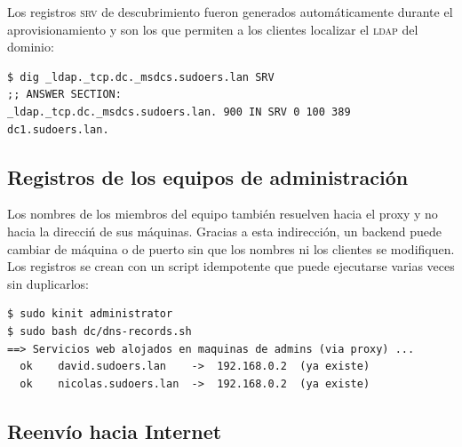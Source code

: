 
Los registros \textsc{srv} de descubrimiento fueron generados
autom\'aticamente durante el aprovisionamiento y son los que permiten a los
clientes localizar el \textsc{ldap} del dominio:

\begin{lstlisting}[style=terminal]
$ dig _ldap._tcp.dc._msdcs.sudoers.lan SRV
;; ANSWER SECTION:
_ldap._tcp.dc._msdcs.sudoers.lan. 900 IN SRV 0 100 389 dc1.sudoers.lan.
\end{lstlisting}


\subsection{Registros de los equipos de administraci\'on}

Los nombres de los miembros del equipo tambi\'en resuelven hacia el proxy y
no hacia la direcci\'n de sus m\'aquinas. Gracias a esta indirecci\'on, un
backend puede cambiar de m\'aquina o de puerto sin que los nombres ni los
clientes se modifiquen. Los registros se crean con un script idempotente
que puede ejecutarse varias veces sin duplicarlos:

\begin{lstlisting}[style=terminal]
$ sudo kinit administrator
$ sudo bash dc/dns-records.sh
==> Servicios web alojados en maquinas de admins (via proxy) ...
  ok    david.sudoers.lan    ->  192.168.0.2  (ya existe)
  ok    nicolas.sudoers.lan  ->  192.168.0.2  (ya existe)
\end{lstlisting}


\subsection{Reenv\'io hacia Internet}

